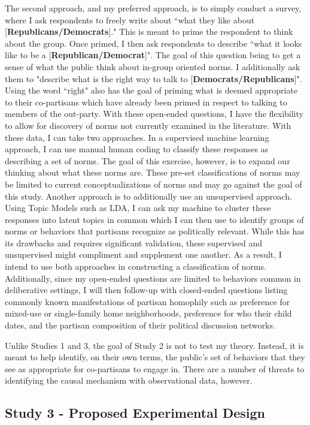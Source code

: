 \documentclass [12pt]{article}
\begin{document}
The second approach, and my preferred approach, is to simply conduct a survey, where I ask respondents to freely write about ``what they like about [\textbf{Republicans/Democrats}]." This is meant to prime the respondent to think about the group. Once primed, I then ask respondents to describe ``what it looks like to be a [\textbf{Republican/Democrat}]". The goal of this question being to get a sense of what the public think about in-group oriented norms. I additionally ask them to "describe what is the right way to talk to [\textbf{Democrats/Republicans}]". Using the word ``right" also has the goal of priming what is deemed appropriate to their co-partisans which have already been primed in respect to talking to members of the out-party. With these open-ended questions, I have the flexibility to allow for discovery of norms not currently examined in the literature. With these data, I can take two approaches. In a supervised machine learning approach, I can use manual human coding to classify these responses as describing a set of norms. The goal of this exercise, however, is to expand our thinking about what these norms are. These pre-set classifications of norms may be limited to current conceptualizations of norms and may go against the goal of this study. Another approach is to additionally use an unsupervised approach. Using Topic Models such as LDA, I can ask my machine to cluster these responses into latent topics in common which I can then use to identify groups of norms or behaviors that partisans recognize as politically relevant. While this has its drawbacks and requires significant validation, these supervised and unsupervised might compliment and supplement one another. As a result, I intend to use both approaches in constructing a classification of norms. Additionally, since my open-ended questions are limited to behaviors common in deliberative settings, I will then follow-up with closed-ended questions listing commonly known manifestations of partisan homophily such as preference for mixed-use or single-family home neighborhoods, preference for who their child dates, and the partisan composition of their political discussion networks. 

Unlike Studies 1 and 3, the goal of Study 2 is not to test my theory. Instead, it is meant to help identify, on their own terms, the public's set of behaviors that they see as appropriate for co-partisans to engage in. There are a number of threats to identifying the causal mechanism with observational data, however. 


\subsection{Study 3 - Proposed Experimental Design}
\end{document}
